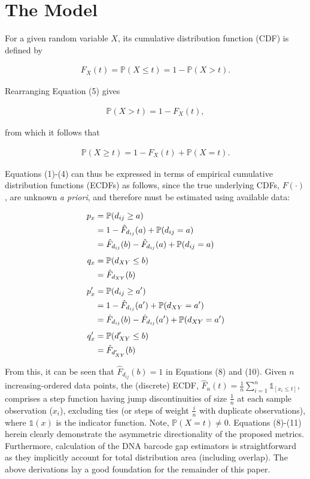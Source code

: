 \documentclass[12pt]{article}
\begin{document}
\section{The Model}

For a given random variable $X$, its cumulative distribution function (CDF) is defined by

\begin{align}
F_X(t) = \mathbb{P}(X \leq t) = 1 - \mathbb{P}(X > t). 
\end{align}

\noindent Rearranging Equation (5) gives

\begin{align}
\mathbb{P}(X > t) = 1 - F_X(t),
\end{align}

\noindent from which it follows that

\begin{align}
\mathbb{P}(X \geq t) = 1 - F_X(t) + \mathbb{P}(X = t).
\end{align}

Equations (1)-(4) can thus be expressed in terms of empirical cumulative distribution functions (ECDFs) as follows, since the true underlying CDFs, $F(\cdot)$, are unknown \textit{a priori}, and therefore must be estimated using available data:

\begin{align}
p_x  &= \mathbb{P}(d_{ij} \geq a) \notag \\
     &= 1 - \hat{F}_{d_{ij}}(a) + \mathbb{P}(d_{ij} = a) \notag \\
     &= \hat{F}_{d_{ij}}(b) - \hat{F}_{d_{ij}}(a) +  \mathbb{P}(d_{ij} = a) \\[1ex]
q_x  &=  \mathbb{P}(d_{XY} \leq b) \notag \\
     &= \hat{F}_{d_{XY}}(b) \\[1ex]
p'_x &=  \mathbb{P}(d_{ij} \geq a') \notag \\
     &= 1 - \hat{F}_{d_{ij}}(a') +  \mathbb{P}(d_{XY} = a') \notag \\
     &= \hat{F}_{d_{ij}}(b) - \hat{F}_{d_{ij}}(a') +  \mathbb{P}(d_{XY} = a')  \\[1ex]
q'_x &=  \mathbb{P}(d'_{XY} \leq b) \notag \\
     &= \hat{F}_{d'_{XY}}(b)
\end{align}

From this, it can be seen that $\hat{F}_{d_{ij}}(b) = 1$ in Equations (8) and (10). Given $n$ \\ increasing-ordered data points, the (discrete) ECDF, $\hat{F}_n(t) = \frac{1}{n}\sum_{i = 1}^n\mathds{1}_{[x_i \leq t]}$, comprises a step function having jump discontinuities of size $\frac{1}{n}$ at each sample observation ($x_i$), excluding ties (or steps of weight $\frac{i}{n}$ with duplicate observations), where $\mathds{1}(x)$ is the indicator function. Note, $\mathbb{P}(X = t) \neq 0$. Equations (8)-(11) herein clearly demonstrate the asymmetric directionality of the proposed metrics. Furthermore, calculation of the DNA barcode gap estimators is straightforward as they implicitly account for total distribution area (including overlap). The above derivations lay a good foundation for the remainder of this paper.
\end{document}
